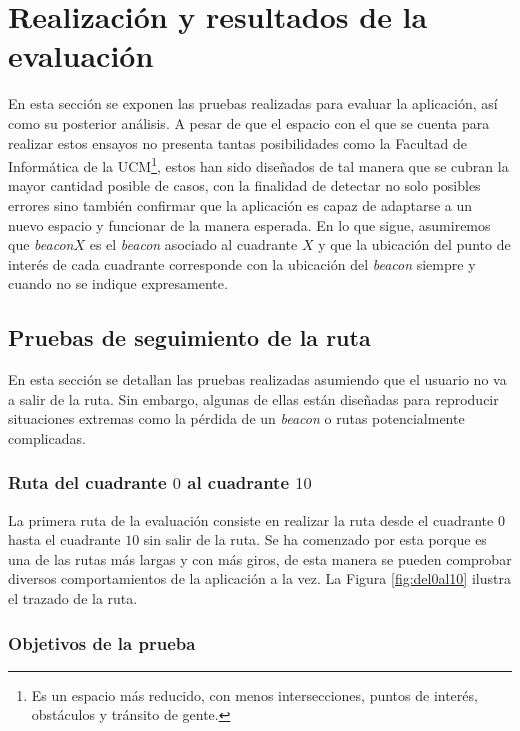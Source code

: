 \section{Realización y resultados de la evaluación}
\label{sec:realizYresult}

En esta sección se exponen las pruebas realizadas para evaluar la aplicación, así como su posterior análisis. A pesar de que el espacio con el que se cuenta para realizar estos ensayos no presenta tantas posibilidades como la Facultad de Informática de la UCM\footnote{Es un espacio más reducido, con menos intersecciones, puntos de interés, obstáculos y tránsito de gente.}, estos han sido diseñados de tal manera que se cubran la mayor cantidad posible de casos, con la finalidad de detectar no solo posibles errores sino también confirmar que la aplicación es capaz de adaptarse a un nuevo espacio y funcionar de la manera esperada. En lo que sigue, asumiremos que \textit{beacon$X$} es el \textit{beacon} asociado al cuadrante $X$ y que la ubicación del punto de interés de cada cuadrante corresponde con la ubicación del \textit{beacon} siempre y cuando no se indique expresamente. 

\subsection{Pruebas de seguimiento de la ruta}
En esta sección se detallan las pruebas realizadas asumiendo que el usuario no va a salir de la ruta. Sin embargo, algunas de ellas están diseñadas para reproducir situaciones extremas como la pérdida de un \textit{beacon} o rutas potencialmente complicadas.


\subsubsection{Ruta del cuadrante $0$ al cuadrante $10$}
\label{subsub:0al10}
La primera ruta de la evaluación consiste en realizar la ruta desde el cuadrante $0$ hasta el cuadrante $10$ sin salir de la ruta. Se ha comenzado por esta porque es una de las rutas más largas y con más giros, de esta manera se pueden comprobar diversos comportamientos de la aplicación a la vez. La Figura \ref{fig:del0al10} ilustra el trazado de la ruta.


\subsubsection*{Objetivos de la prueba}

